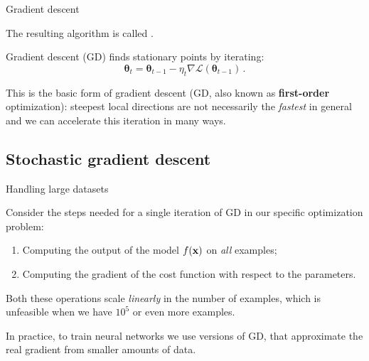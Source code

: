 \documentclass[12pt,aspectratio=169]{beamer}
\begin{document}
\begin{frame}{Gradient descent}

	The resulting algorithm is called .
	\begin{tcolorbox}
		Gradient descent (GD) finds stationary points by iterating:
		\begin{equation}
			\boldsymbol{\theta}_t = \boldsymbol{\theta}_{t-1} - \eta_t \nabla \mathcal{L}(\boldsymbol{\theta}_{t-1}) \,.
		\end{equation}
	\end{tcolorbox}

	This is the basic form of gradient descent (GD, also known as \textbf{first-order} optimization): steepest local directions are not necessarily the \textit{fastest} in general and we can accelerate this iteration in many ways.

\end{frame}

\subsection{Stochastic gradient descent}

\begin{frame}{Handling large datasets}

	Consider the steps needed for a single iteration of GD in our specific optimization problem:

	\begin{enumerate}
		\item Computing the output of the model $f(\boldsymbol{\mathbf{x}})$ on \textit{all} examples;
		\item Computing the gradient of the cost function with respect to the parameters.
	\end{enumerate}

	Both these operations scale \textit{linearly} in the number of examples, which is unfeasible when we have $10^5$ or even more examples.

	In practice, to train neural networks we use  versions of GD, that approximate the real gradient from smaller amounts of data.

\end{frame}
\end{document}
